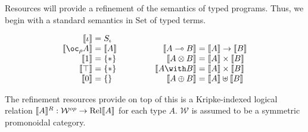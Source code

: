 
Resources will provide a refinement of the semantics of typed programs.
Thus, we begin with a standard semantics in $\mathrm{Set}$ of typed terms.

\begin{displaymath}
  \begin{array}{c@{\hspace{0.5in}}c}
    \begin{array}{r@{\hspace{0.3em}}c@{\hspace{0.3em}}l}
      \sem{\base} &=& S_\base \\
      \sem{\excl{\rho}{A}} &=& \sem{A} \\
      \sem{\tensorOne} &=& \{*\} \\
      \sem{\withTOne} &=& \{*\} \\
      \sem{\sumTZero} &=& \{\} \\
    \end{array}
    &
    \begin{array}{r@{\hspace{0.3em}}c@{\hspace{0.3em}}l}
      \\
      \sem{\fun{A}{B}} &=& \sem{A} \rightarrow \sem{B} \\
      \sem{\tensor{A}{B}} &=& \sem{A} \times \sem{B} \\
      \sem{\withT{A}{B}} &=& \sem{A} \times \sem{B} \\
      \sem{\sumT{A}{B}} &=& \sem{A} \uplus \sem{B} \\
    \end{array}
  \end{array}
\end{displaymath}

The refinement resources provide on top of this is a Kripke-indexed logical
relation $\llbracket A \rrbracket^R : \mathcal{W}^{op} \to \operatorname{Rel}\llbracket A \rrbracket$ for each type $A$.
$\mathcal{W}$ is assumed to be a symmetric promonoidal category.

